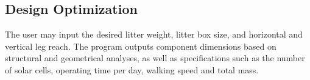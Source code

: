 \subsection{Design Optimization}

The user may input the desired litter weight, litter box size, and horizontal and vertical leg reach. The program outputs component dimensions based on structural and geometrical analyses, as well as specifications such as the number of solar cells, operating time per day, walking speed and total mass.